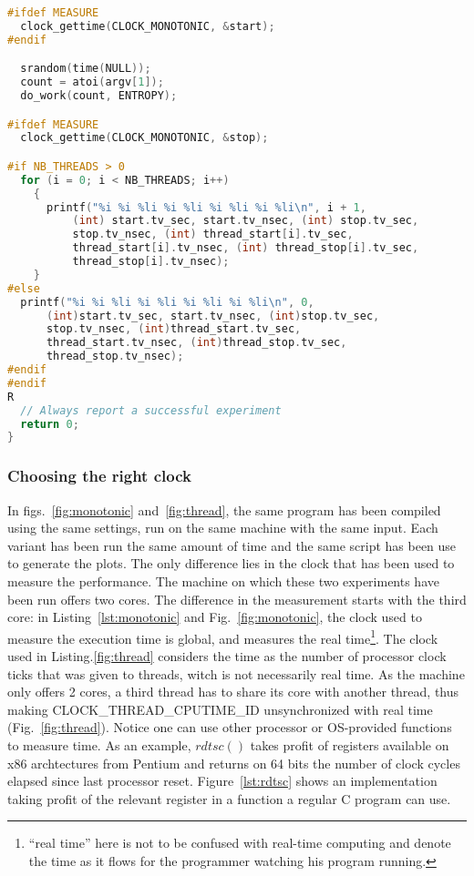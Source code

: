 \begin{lstlisting}[caption={$clock\_gettime()$ before and after the portion of code being monitored collects the necessary data to compute the time used to run this portion of a program.},label={lst:instrumentation},language=C]
#ifdef MEASURE
  clock_gettime(CLOCK_MONOTONIC, &start);
#endif

  srandom(time(NULL));
  count = atoi(argv[1]);
  do_work(count, ENTROPY);

#ifdef MEASURE
  clock_gettime(CLOCK_MONOTONIC, &stop);

#if NB_THREADS > 0
  for (i = 0; i < NB_THREADS; i++)
    {
      printf("%i %i %li %i %li %i %li %i %li\n", i + 1,
          (int) start.tv_sec, start.tv_nsec, (int) stop.tv_sec,
          stop.tv_nsec, (int) thread_start[i].tv_sec,
          thread_start[i].tv_nsec, (int) thread_stop[i].tv_sec,
          thread_stop[i].tv_nsec);
    }
#else
  printf("%i %i %li %i %li %i %li %i %li\n", 0,
      (int)start.tv_sec, start.tv_nsec, (int)stop.tv_sec,
      stop.tv_nsec, (int)thread_start.tv_sec,
      thread_start.tv_nsec, (int)thread_stop.tv_sec,
      thread_stop.tv_nsec);
#endif
#endif
R
  // Always report a successful experiment
  return 0;
}
\end{lstlisting}

\subsubsection{Choosing the right clock}
\label{app:clock}

In figs.~\ref{fig:monotonic} and~\ref{fig:thread}, the same program has been compiled using the same settings, run on the same machine with the same input. Each variant has been run the same amount of time and the same script has been use to generate the plots. The only difference lies in the clock that has been used to measure the performance. The machine on which these two experiments have been run offers two cores. The difference in the measurement starts with the third core: in Listing~\ref{lst:monotonic} and Fig.~\ref{fig:monotonic}, the clock used to measure the execution time is global, and measures the real time\footnote{``real time'' here is not to be confused with real-time computing and denote the time as it flows for the programmer watching his program running.}. The clock used in Listing.\ref{fig:thread} considers the time as the number of processor clock ticks that was given to threads, witch is not necessarily real time. As the machine only offers 2 cores, a third thread has to share its core with another thread, thus making CLOCK\_THREAD\_CPUTIME\_ID unsynchronized with real time (Fig.~\ref{fig:thread}). Notice one can use other processor or OS-provided functions to measure time. As an example, $rdtsc()$ takes profit of registers available on x86 archtectures from Pentium and returns on 64 bits the number of clock cycles elapsed since last processor reset. Figure~\ref{lst:rdtsc} shows an implementation taking profit of the relevant register in a function a regular C program can use.


